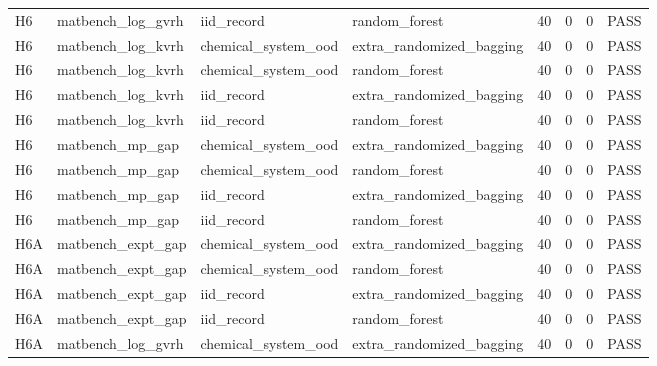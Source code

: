 \documentclass[10pt]{article}
\begin{document}
\begin{landscape}
\begin{longtable}{L{.32in}L{1.05in}L{1.2in}L{1.3in}L{.42in}L{.42in}L{.42in}L{.48in}}
H6 & matbench\_\allowbreak{}log\_\allowbreak{}gvrh & iid\_\allowbreak{}record & random\_\allowbreak{}forest & 40 & 0 & 0 & PASS\\
H6 & matbench\_\allowbreak{}log\_\allowbreak{}kvrh & chemical\_\allowbreak{}system\_\allowbreak{}ood & extra\_\allowbreak{}randomized\_\allowbreak{}bagging & 40 & 0 & 0 & PASS\\
H6 & matbench\_\allowbreak{}log\_\allowbreak{}kvrh & chemical\_\allowbreak{}system\_\allowbreak{}ood & random\_\allowbreak{}forest & 40 & 0 & 0 & PASS\\
H6 & matbench\_\allowbreak{}log\_\allowbreak{}kvrh & iid\_\allowbreak{}record & extra\_\allowbreak{}randomized\_\allowbreak{}bagging & 40 & 0 & 0 & PASS\\
H6 & matbench\_\allowbreak{}log\_\allowbreak{}kvrh & iid\_\allowbreak{}record & random\_\allowbreak{}forest & 40 & 0 & 0 & PASS\\
H6 & matbench\_\allowbreak{}mp\_\allowbreak{}gap & chemical\_\allowbreak{}system\_\allowbreak{}ood & extra\_\allowbreak{}randomized\_\allowbreak{}bagging & 40 & 0 & 0 & PASS\\
H6 & matbench\_\allowbreak{}mp\_\allowbreak{}gap & chemical\_\allowbreak{}system\_\allowbreak{}ood & random\_\allowbreak{}forest & 40 & 0 & 0 & PASS\\
H6 & matbench\_\allowbreak{}mp\_\allowbreak{}gap & iid\_\allowbreak{}record & extra\_\allowbreak{}randomized\_\allowbreak{}bagging & 40 & 0 & 0 & PASS\\
H6 & matbench\_\allowbreak{}mp\_\allowbreak{}gap & iid\_\allowbreak{}record & random\_\allowbreak{}forest & 40 & 0 & 0 & PASS\\
H6A & matbench\_\allowbreak{}expt\_\allowbreak{}gap & chemical\_\allowbreak{}system\_\allowbreak{}ood & extra\_\allowbreak{}randomized\_\allowbreak{}bagging & 40 & 0 & 0 & PASS\\
H6A & matbench\_\allowbreak{}expt\_\allowbreak{}gap & chemical\_\allowbreak{}system\_\allowbreak{}ood & random\_\allowbreak{}forest & 40 & 0 & 0 & PASS\\
H6A & matbench\_\allowbreak{}expt\_\allowbreak{}gap & iid\_\allowbreak{}record & extra\_\allowbreak{}randomized\_\allowbreak{}bagging & 40 & 0 & 0 & PASS\\
H6A & matbench\_\allowbreak{}expt\_\allowbreak{}gap & iid\_\allowbreak{}record & random\_\allowbreak{}forest & 40 & 0 & 0 & PASS\\
H6A & matbench\_\allowbreak{}log\_\allowbreak{}gvrh & chemical\_\allowbreak{}system\_\allowbreak{}ood & extra\_\allowbreak{}randomized\_\allowbreak{}bagging & 40 & 0 & 0 & PASS\\

\end{longtable}
\end{landscape}
\end{document}
